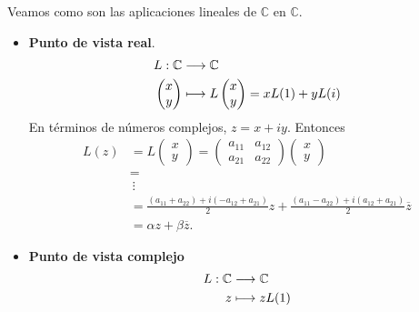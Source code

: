 Veamos como son las aplicaciones lineales de $\mathbb{C}$ en $\mathbb{C}$.
\begin{itemize}
    \item \textbf{Punto de vista real}.
          \begin{align*}
              L : \mathbb{C}        & \longrightarrow \mathbb{C}                     \\
              \begin{pmatrix}
                  x \\
                  y
              \end{pmatrix} & \longmapsto L\begin{pmatrix}
                                               x \\
                                               y
                                           \end{pmatrix} = xL(1) + yL(i)
          \end{align*}
          En términos de números complejos, $z = x + iy$. Entonces
          \begin{align*}
              L(z) & = L \begin{pmatrix}
                             x \\
                             y
                         \end{pmatrix} = \begin{pmatrix}
                                             a_{11} & a_{12} \\
                                             a_{21} & a_{22}
                                         \end{pmatrix} \begin{pmatrix}
                                                           x \\
                                                           y
                                                       \end{pmatrix}                                                                   \\
                   & =                                                                                                                  \\
                   & \ \vdots                                                                                                           \\
                   & = \frac{(a_{11} + a_{22}) + i(-a_{12} + a_{21})}{2}z + \frac{(a_{11} - a_{22}) +i(a_{12} + a_{21})}{2}\overline{z} \\
                   & = \alpha z + \beta \overline{z}.
          \end{align*}
    \item \textbf{Punto de vista complejo}
          \begin{align*}
              L : \mathbb{C} & \longrightarrow \mathbb{C} \\
              z        & \longmapsto zL(1)
          \end{align*}
\end{itemize}

